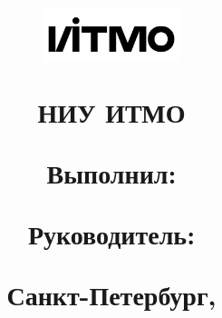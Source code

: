 \begin{titlepage}

\thispagestyle{empty}

\title{

\includegraphics[width=4cm]{images/ITMO_logo.png} 

\vspace{1em}
НИУ ИТМО 
\vspace{4em}

\begin{center}
\large\textsc{\textbf{\name}}

\vspace{1em}
\large\textsc{\textbf{\matter}}

\end{center}

\vspace{3em}

\begin{flushright}
\normalsize{ 
Выполнил: \\ \textbf{\madeby} 

Руководитель: \\ \textbf{\teacher} 
}
\end{flushright}	

\vfill

\begin{center}
\small{Санкт-Петербург, \the\year}
\end{center}
}


\author{}
\date{}
\maketitle
\thispagestyle{empty}
\end{titlepage}